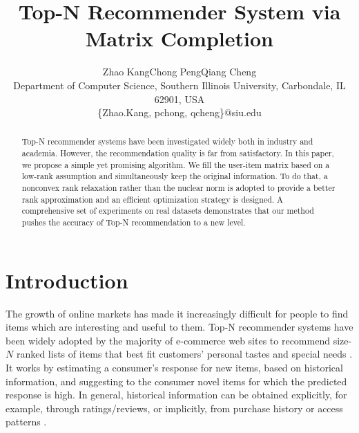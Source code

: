 \documentclass[letterpaper]{article}
\begin{document}
%
\title{Top-N Recommender System via Matrix Completion}
\author{Zhao Kang\quad Chong Peng\quad Qiang Cheng\\
Department of Computer Science, Southern Illinois University, Carbondale, IL 62901, USA\\
\{Zhao.Kang, pchong, qcheng\}@siu.edu\\
}
\maketitle
\begin{abstract}
Top-N recommender systems have been investigated widely both in industry and academia. However, the recommendation quality is far from satisfactory. In this paper, we propose a simple yet promising algorithm. We fill the user-item matrix based on a low-rank assumption and simultaneously keep the original information. To do that, a nonconvex rank relaxation rather than the nuclear norm is adopted to provide a better rank approximation and an efficient optimization strategy is designed. A comprehensive set of experiments on real datasets demonstrates that our method pushes the accuracy of Top-N recommendation to a new level.

\end{abstract}

\section{Introduction}
The growth of online markets has made it increasingly difficult for people to find items which are interesting and useful to them. Top-N recommender systems have been widely adopted by the majority of e-commerce web sites to recommend size-$N$ ranked lists of items that best fit customers' personal tastes and special needs \cite{linden2003amazon}. It works by estimating a consumer's  response for new items, based on historical information, and suggesting to the consumer novel items for which the predicted response is high. In general, historical information can be obtained explicitly, for example, through ratings/reviews, or implicitly, from purchase history or access patterns \cite{desrosiers2011comprehensive}.
\end{document}
